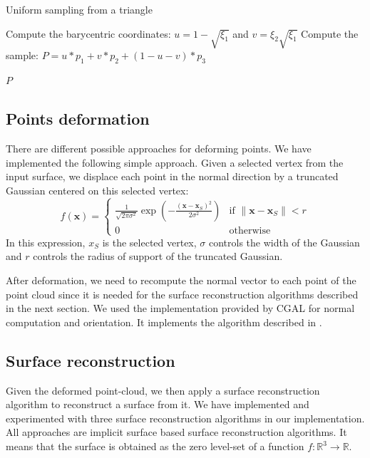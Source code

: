 \documentclass[ams]{U-AizuGT}
\def\x{\mathbf{x}}
\def\R{\mathbb{R}}
\begin{document}
\begin{algorithm}
\caption{Uniform sampling from a triangle}
\label{alg:sample}
\begin{algorithmic}


\State Compute the barycentric coordinates: $u = 1-\sqrt{\xi_1}$ 
and $v = \xi_2 \sqrt{\xi_1}$
\State Compute the sample: $P = u * p_1 + v * p_2 + (1 - u - v) * p_3$

\Return $P$
\EndFunction
\end{algorithmic}
\end{algorithm}
  

\subsection{Points deformation}
There are different possible approaches for deforming points. We have implemented the following simple approach.
Given a selected vertex from the input surface, we displace each point in the normal direction
by a truncated Gaussian centered on this selected vertex:
\[
f(\x)=
\begin{cases}
\frac{1}{\sqrt{2\pi\sigma^2}} \exp\left(- \frac{(\x- \x_S)^{2}}{2 \sigma^{2}}\right) & \text{if } \|\x-\x_S\| < r \\
0 & \text{otherwise}
\end{cases}
\]
In this expression, $x_S$ is the selected vertex, $\sigma$ controls the width of the Gaussian and $r$ controls 
the radius of support of the truncated Gaussian.

After deformation, we need to recompute the normal vector to each point of the point cloud 
since it is needed for the surface reconstruction algorithms described in the next section.
We used the implementation provided by CGAL \cite{cgal} for normal computation and orientation.
It implements the algorithm described in \cite{HRDMS92}.

\subsection{Surface reconstruction}
Given the deformed point-cloud, we then apply a surface reconstruction algorithm to reconstruct a surface from it. 
We have implemented and experimented with three surface reconstruction algorithms in our implementation.
All approaches are implicit surface based surface reconstruction algorithms. 
It means that the surface is obtained as the zero level-set of a function $f: \R^3 \rightarrow \R$. 
\end{document}
